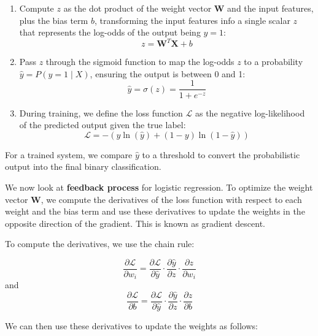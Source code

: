 		\begin{enumerate}[]
			\item Compute $z$ as the dot product of the weight vector $\textbf{W}$ and the input features, plus the bias term $b$, transforming the input features info a single scalar $z$ that represents the log-odds of the output being $y=1$: 
			\begin{equation}
				z= \textbf{W}^{T}\textbf{X} + b
			\end{equation}
			
			\item Pass $z$ through the sigmoid function to map the log-odds $z$ to a probability $\hat{y} = P(y = 1 \mid X)$, ensuring the output is between 0 and 1: 
			\begin{equation}
				\hat{y} = \sigma(z) = \frac{1}{1 + e^{-z}}
			\end{equation}
			
			\item During training, we define the loss function $\mathcal{L}$ as the negative log-likelihood of the predicted output given the true label: 
			\begin{equation}
				\mathcal{L} = -\left(y\ln(\hat{y}) + (1-y)\ln(1-\hat{y})\right)
			\end{equation}
		\end{enumerate}
		
		For a trained system, we compare $\hat{y}$ to a threshold to convert the probabilistic output into the final binary classification.
		
		\bigskip
		
		We now look at \textbf{feedback process} for logistic regression. To optimize the weight vector $\textbf{W}$, we compute the derivatives of the loss function with respect to each weight and the bias term and use these derivatives to update the weights in the opposite direction of the gradient. This is known as gradient descent.
		
		To compute the derivatives, we use the chain rule:
		
		$$
		\frac{\partial\mathcal{L}}{\partial w_i} =
		\frac{\partial\mathcal{L}}{\partial \hat{y}} \cdot
		\frac{\partial \hat{y}}{\partial z} \cdot
		\frac{\partial z}{\partial w_i}
		$$ and
		$$
		\frac{\partial\mathcal{L}}{\partial b} =
		\frac{\partial\mathcal{L}}{\partial \hat{y}} \cdot
		\frac{\partial \hat{y}}{\partial z} \cdot
		\frac{\partial z}{\partial b}
		$$
		
		We can then use these derivatives to update the weights as follows:
		

